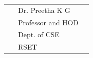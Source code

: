 	\vspace{2cm}

\begin{flushleft}
	
	
	\begin{longtable}{p{5.8cm} p{5.8cm} p{5.8cm}}
		{}& {Dr. Preetha K G} & {}\\
		{}& {Professor and HOD} & {}\\
		{}&  {Dept. of CSE} & {}\\
		{} ~&{RSET} & {} \\
		
	\end{longtable}
\end{flushleft}


%	
%	
%		

